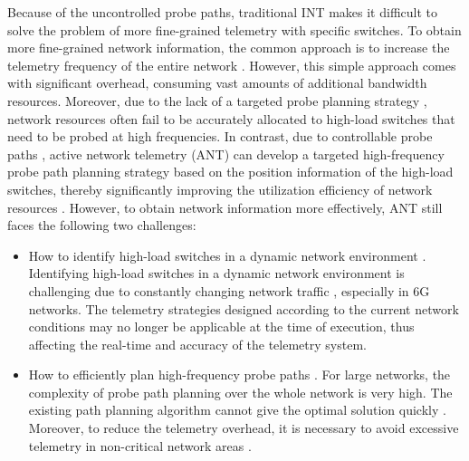\documentclass[journal]{IEEEtran}
\begin{document}
Because of the uncontrolled probe paths, traditional INT makes it difficult to solve the problem of more fine-grained telemetry with specific switches. To obtain more fine-grained network information, the common approach is to increase the telemetry frequency of the entire network \cite{9}. However, this simple approach comes with significant overhead, consuming vast amounts of additional bandwidth resources.
Moreover, due to the lack of a targeted probe planning strategy \cite{10,11}, network resources often fail to be accurately allocated to high-load switches that need to be probed at high frequencies.
In contrast, due to controllable probe paths \cite{12}, active network telemetry (ANT) can develop a targeted high-frequency probe path planning strategy based on the position information of the high-load switches, thereby significantly improving the utilization efficiency of network resources \cite{8,13}. However, to obtain network information more effectively, ANT still faces the following two challenges:
\begin{itemize}
\item How to identify high-load switches in a dynamic network environment \cite{14}. Identifying high-load switches in a dynamic network environment is challenging due to constantly changing network traffic \cite{16}, especially in 6G networks.  The telemetry strategies \cite{15} designed according to the current network conditions may no longer be applicable at the time of execution, thus affecting the real-time and accuracy of the telemetry system.
\item How to efficiently plan high-frequency probe paths \cite{1}. For large networks, the complexity of probe path planning over the whole network is very high. The existing path planning algorithm cannot give the optimal solution quickly \cite{21, 20}. Moreover, to reduce the telemetry overhead, it is necessary to avoid excessive telemetry in non-critical network areas \cite{25}.
\end{itemize}
\end{document}
